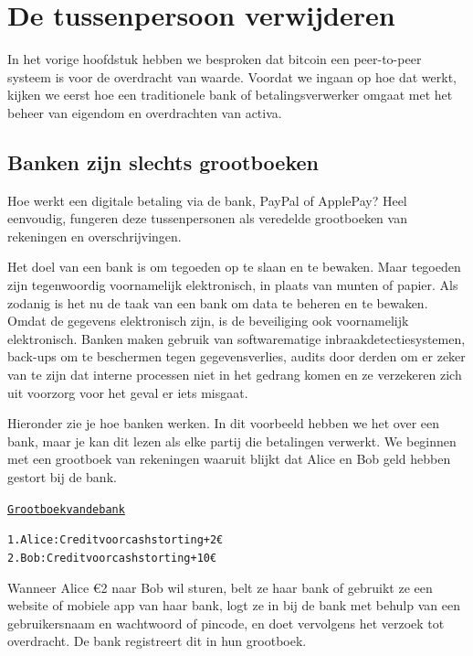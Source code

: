 \hypertarget{chap2}{%
\chapter{De tussenpersoon verwijderen}\label{chap2}}

In het vorige hoofdstuk hebben we besproken dat bitcoin een peer-to-peer systeem is voor de overdracht van waarde. Voordat we ingaan op hoe dat werkt, kijken we eerst hoe een traditionele bank of betalingsverwerker omgaat met het beheer van eigendom en overdrachten van activa.

\section{Banken zijn slechts grootboeken}

Hoe werkt een digitale betaling via de bank, PayPal of ApplePay? Heel eenvoudig, fungeren deze tussenpersonen als veredelde grootboeken van rekeningen en overschrijvingen.

Het doel van een bank is om tegoeden op te slaan en te bewaken. Maar tegoeden zijn tegenwoordig voornamelijk elektronisch, in plaats van munten of papier. Als zodanig is het nu de taak van een bank om data te beheren en te bewaken. Omdat de gegevens elektronisch zijn, is de beveiliging ook voornamelijk elektronisch. Banken maken gebruik van softwarematige inbraakdetectiesystemen, back-ups om te beschermen tegen gegevensverlies, audits door derden om er zeker van te zijn dat interne processen niet in het gedrang komen en ze verzekeren zich uit voorzorg voor het geval er iets misgaat.

Hieronder zie je hoe banken werken. In dit voorbeeld hebben we het over een bank, maar je kan dit lezen als elke partij die betalingen verwerkt. We beginnen met een grootboek van rekeningen waaruit blijkt dat Alice en Bob geld hebben gestort bij de bank.

\begin{alltt}
\underline{Grootboek van de bank}

    1. Alice: Credit voor cash storting +2€
    2. Bob: Credit voor cash storting +10€
\end{alltt}

Wanneer Alice €2 naar Bob wil sturen, belt ze haar bank of gebruikt ze een website of mobiele app van haar bank, logt ze in bij de bank met behulp van een gebruikersnaam en wachtwoord of pincode, en doet vervolgens het verzoek tot overdracht. De bank registreert dit in hun grootboek.

